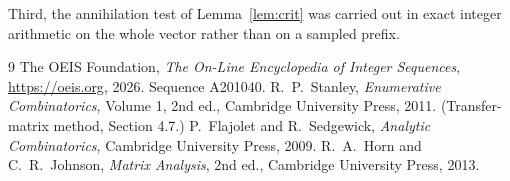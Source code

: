 \documentclass[11pt,a4paper]{article}
\theoremstyle{plain}
\theoremstyle{definition}
\begin{document}
Third, the annihilation test of Lemma~\ref{lem:crit} was carried out in exact integer
arithmetic on the whole vector rather than on a sampled prefix.

\begin{thebibliography}{9}
 The OEIS Foundation, \emph{The On-Line Encyclopedia of Integer
Sequences}, \url{https://oeis.org}, 2026. Sequence A201040.
 R.~P.~Stanley, \emph{Enumerative Combinatorics}, Volume 1, 2nd ed.,
Cambridge University Press, 2011. (Transfer-matrix method, Section 4.7.)
 P.~Flajolet and R.~Sedgewick, \emph{Analytic Combinatorics}, Cambridge
University Press, 2009.
 R.~A.~Horn and C.~R.~Johnson, \emph{Matrix Analysis}, 2nd ed., Cambridge
University Press, 2013.
\end{thebibliography}
\end{document}
